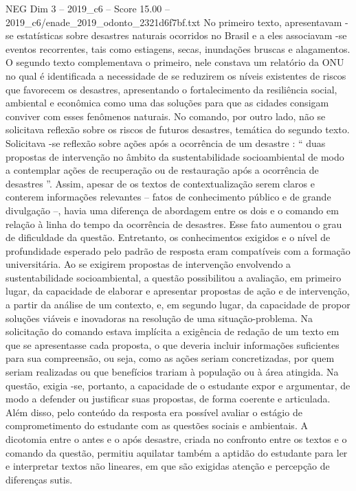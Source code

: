 \begin{textsample}{NEG Dim 3 – 2019\_c6 – Score 15.00 – 2019\_c6/enade\_2019\_odonto\_2321d6f7bf.txt}
No primeiro texto, apresentavam -se estatísticas sobre desastres naturais ocorridos no Brasil e a eles associavam -se eventos recorrentes, tais como estiagens, secas, inundações bruscas e alagamentos.
O segundo texto complementava o primeiro, nele constava um relatório da ONU no qual é identificada a necessidade de se reduzirem os níveis existentes de riscos que favorecem os desastres, apresentando o fortalecimento da resiliência social, ambiental e econômica como uma das soluções para que as cidades consigam conviver com esses fenômenos naturais.
No comando, por outro lado, não se solicitava reflexão sobre os riscos de futuros desastres, temática do segundo texto.
Solicitava -se reflexão sobre ações após a ocorrência de um desastre : “ duas propostas de intervenção no âmbito da sustentabilidade socioambiental de modo a contemplar ações de recuperação ou de restauração após a ocorrência de desastres ”.
Assim, apesar de os textos de contextualização serem claros e conterem informações relevantes – fatos de conhecimento público e de grande divulgação –, havia uma diferença de abordagem entre os dois e o comando em relação à linha do tempo da ocorrência de desastres.
Esse fato aumentou o grau de dificuldade da questão.
Entretanto, os conhecimentos exigidos e o nível de profundidade esperado pelo padrão de resposta eram compatíveis com a formação universitária.
Ao se exigirem propostas de intervenção envolvendo a sustentabilidade socioambiental, a questão possibilitou a avaliação, em primeiro lugar, da capacidade de elaborar e apresentar propostas de ação e de intervenção, a partir da análise de um contexto, e, em segundo lugar, da capacidade de propor soluções viáveis e inovadoras na resolução de uma situação-problema.
Na solicitação do comando estava implícita a exigência de redação de um texto em que se apresentasse cada proposta, o que deveria incluir informações suficientes para sua compreensão, ou seja, como as ações seriam concretizadas, por quem seriam realizadas ou que benefícios trariam à população ou à área atingida.
Na questão, exigia -se, portanto, a capacidade de o estudante expor e argumentar, de modo a defender ou justificar suas propostas, de forma coerente e articulada.
Além disso, pelo conteúdo da resposta era possível avaliar o estágio de comprometimento do estudante com as questões sociais e ambientais.
A dicotomia entre o antes e o após desastre, criada no confronto entre os textos e o comando da questão, permitiu aquilatar também a aptidão do estudante para ler e interpretar textos não lineares, em que são exigidas atenção e percepção de diferenças sutis.

\end{textsample}
